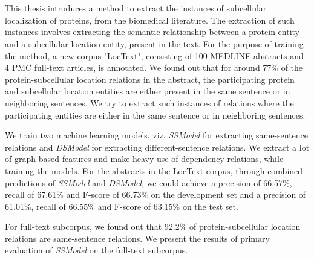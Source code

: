\chapter{\abstractname}


This thesis introduces a method to extract the instances of subcellular localization of proteins, from the biomedical literature. The extraction of such instances involves extracting the semantic relationship between a protein entity and a subcellular location entity, present in the text. For the purpose of training the method, a new corpus "LocText", consisting of 100 MEDLINE abstracts and 4 PMC full-text articles, is annotated. We found out that for around 77\% of the protein-subcellular location relations in the abstract, the participating protein and subcellular location entities are either present in the same sentence or in neighboring sentences. We try to extract such instances of relations where the participating entities are either in the same sentence or in neighboring sentences.

We train two machine learning models, viz. \textit{SSModel} for extracting same-sentence relations and \textit{DSModel} for extracting different-sentence relations. We extract a lot of graph-based features and make heavy use of dependency relations, while training the models. For the abstracts in the LocText corpus, through combined predictions of \textit{SSModel} and \textit{DSModel}, we could achieve a precision of 66.57\%, recall of 67.61\% and F-score of 66.73\% on the development set and a precision of 61.01\%, recall of 66.55\% and F-score of 63.15\% on the test set.

For full-text subcorpus, we found out that 92.2\% of protein-subcellular location relations are same-sentence relations. We present the results of primary evaluation of \textit{SSModel} on the full-text subcorpus.